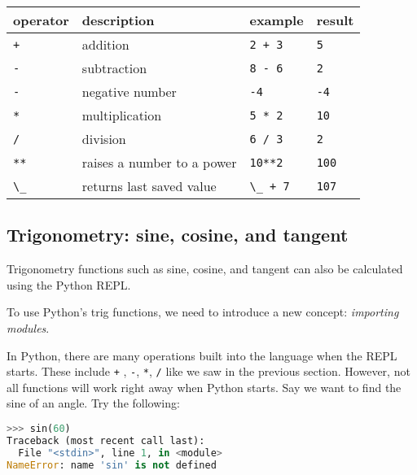 \documentclass{book}
\newcommand{\passthrough}[1]{#1}
\begin{document}
\begin{longtable}[]{@{}llll@{}}
\toprule
operator & description & example & result\tabularnewline
\midrule
\endhead
\passthrough{\lstinline!+!} & addition & \passthrough{\lstinline!2 + 3!}
& \passthrough{\lstinline!5!}\tabularnewline
\passthrough{\lstinline!-!} & subtraction &
\passthrough{\lstinline!8 - 6!} &
\passthrough{\lstinline!2!}\tabularnewline
\passthrough{\lstinline!-!} & negative number &
\passthrough{\lstinline!-4!} &
\passthrough{\lstinline!-4!}\tabularnewline
\passthrough{\lstinline!*!} & multiplication &
\passthrough{\lstinline!5 * 2!} &
\passthrough{\lstinline!10!}\tabularnewline
\passthrough{\lstinline!/!} & division & \passthrough{\lstinline!6 / 3!}
& \passthrough{\lstinline!2!}\tabularnewline
\passthrough{\lstinline!**!} & raises a number to a power &
\passthrough{\lstinline!10**2!} &
\passthrough{\lstinline!100!}\tabularnewline
\passthrough{\lstinline!\_!} & returns last saved value &
\passthrough{\lstinline!\_ + 7!} &
\passthrough{\lstinline!107!}\tabularnewline
\bottomrule
\end{longtable}
    




    
        \hypertarget{trigonometry-sine-cosine-and-tangent}{%
\subsection{Trigonometry: sine, cosine, and
tangent}\label{trigonometry-sine-cosine-and-tangent}}
    




    
        Trigonometry functions such as sine, cosine, and tangent can also be
calculated using the Python REPL.

To use Python's trig functions, we need to introduce a new concept:
\emph{importing modules}.

In Python, there are many operations built into the language when the
REPL starts. These include \passthrough{\lstinline!+!} ,
\passthrough{\lstinline!-!}, \passthrough{\lstinline!*!},
\passthrough{\lstinline!/!} like we saw in the previous section.
However, not all functions will work right away when Python starts. Say
we want to find the sine of an angle. Try the following:

\begin{lstlisting}[language=Python]
>>> sin(60)
Traceback (most recent call last):
  File "<stdin>", line 1, in <module>
NameError: name 'sin' is not defined
\end{lstlisting}
\end{document}
